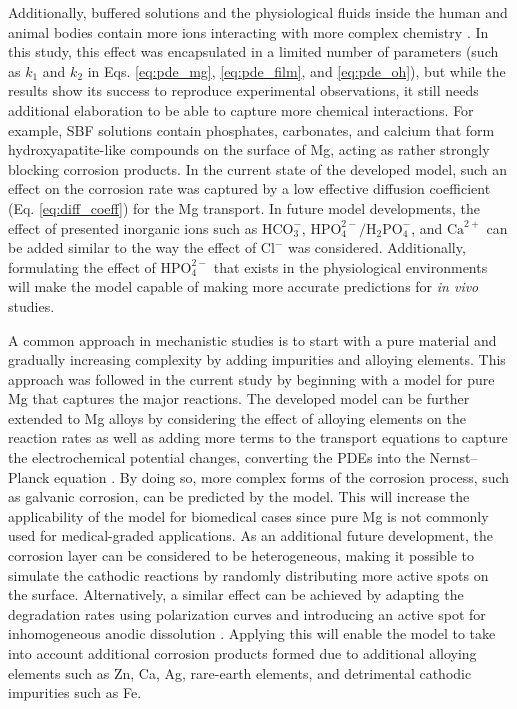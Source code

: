 Additionally, buffered solutions and the physiological fluids inside the human and animal bodies contain more ions interacting with more complex chemistry \cite{Mei2020}. In this study, this effect was encapsulated in a limited number of parameters (such as $k_1$ and $k_2$ in Eqs. \ref{eq:pde_mg}, \ref{eq:pde_film}, and \ref{eq:pde_oh}), but while the results show its success to reproduce experimental observations, it still needs additional elaboration to be able to capture more chemical interactions. For example, {SBF} solutions contain phosphates, carbonates, and calcium that form hydroxyapatite-like compounds on the surface of Mg, acting as rather strongly blocking corrosion products. In the current state of the developed model, such an effect on the corrosion rate was captured by a low effective diffusion coefficient (Eq. \ref{eq:diff_coeff}) for the Mg transport. In future model developments, the effect of presented inorganic ions such as $\mathrm{HCO}^{-}_3$, $\mathrm{HPO}^{2-}_4/\mathrm{H}_2\mathrm{PO}^{-}_4$, and $\mathrm{Ca}^{2+}$ can be added similar to the way the effect of $\mathrm{Cl}^{-}$ was considered. Additionally, formulating the effect of $\mathrm{HPO}^{2-}_4$ that exists in the physiological environments will make the model capable of making more accurate predictions for \textit{in vivo} studies.

A common approach in mechanistic studies is to start with a pure material and gradually increasing complexity by adding impurities and alloying elements. This approach was followed in the current study by beginning with a model for pure Mg that captures the major reactions. The developed model can be further extended to Mg alloys by considering the effect of alloying elements on the reaction rates as well as adding more terms to the transport equations to capture the electrochemical potential changes, converting the {PDE}s into the Nernst–Planck equation \cite{Deshpande2011}. By doing so, more complex forms of the corrosion process, such as galvanic corrosion, can be predicted by the model. This will increase the applicability of the model for biomedical cases since pure Mg is not commonly used for medical-graded applications. As an additional future development, the corrosion layer can be considered to be heterogeneous, making it possible to simulate the cathodic reactions by randomly distributing more active spots on the surface. Alternatively, a similar effect can be achieved by adapting the degradation rates using polarization curves and introducing an active spot for inhomogeneous anodic dissolution \cite{Dolgikh2019}. Applying this will enable the model to take into account additional corrosion products formed due to additional alloying elements such as Zn, Ca, Ag, rare-earth elements, and detrimental cathodic impurities such as Fe.

